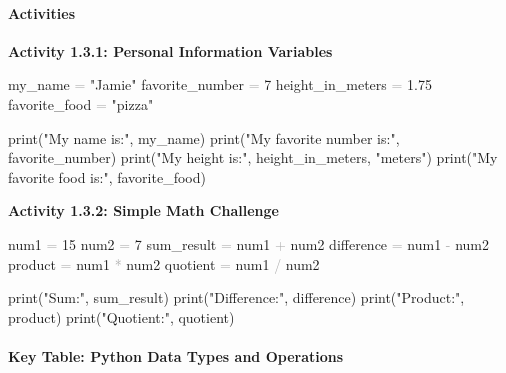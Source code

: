 \documentclass[
  justified,
  openright,
]{tufte-book}
\let\subsection\paragraph
\let\paragraph\paragraph
\newcommand{\StringTok}[1]{\textcolor{CodeString}{#1}}              %
\newcommand{\CodeNumTok}[1]{\textcolor{CodeNumber}{#1}}             %
\newcommand{\OperatorTok}[1]{\textcolor{DarkGray}{#1}}              %
\newenvironment{Shaded}{%
  \begin{mdframed}[style=TufteCode]%
}{%
  \end{mdframed}%
}
\let\subsection\paragraph
\let\paragraph\paragraph
\begin{document}
\subsection{Activities}\label{activities-2}

\textbf{Activity 1.3.1: Personal Information Variables}

\begin{Shaded}
\begin{Highlighting}[]
my\_name \OperatorTok{=} \StringTok{"Jamie"}
favorite\_number \OperatorTok{=} \CodeNumTok{7}
height\_in\_meters \OperatorTok{=} \CodeNumTok{1.75}
favorite\_food \OperatorTok{=} \StringTok{"pizza"}
 
print(\StringTok{"My name is:"}, my\_name)
print(\StringTok{"My favorite number is:"}, favorite\_number)
print(\StringTok{"My height is:"}, height\_in\_meters, \StringTok{"meters"})
print(\StringTok{"My favorite food is:"}, favorite\_food)
\end{Highlighting}
\end{Shaded}

\textbf{Activity 1.3.2: Simple Math Challenge}

\begin{Shaded}
\begin{Highlighting}[]
num1 \OperatorTok{=} \CodeNumTok{15}
num2 \OperatorTok{=} \CodeNumTok{7}
sum\_result \OperatorTok{=} num1 \OperatorTok{+} num2
difference \OperatorTok{=} num1 \OperatorTok{{-}} num2
product \OperatorTok{=} num1 \OperatorTok{*} num2
quotient \OperatorTok{=} num1 \OperatorTok{/} num2
 
print(\StringTok{"Sum:"}, sum\_result)
print(\StringTok{"Difference:"}, difference)
print(\StringTok{"Product:"}, product)
print(\StringTok{"Quotient:"}, quotient)
\end{Highlighting}
\end{Shaded}

\subsection{Key Table: Python Data Types and
Operations}\label{key-table-python-data-types-and-operations}
\end{document}
